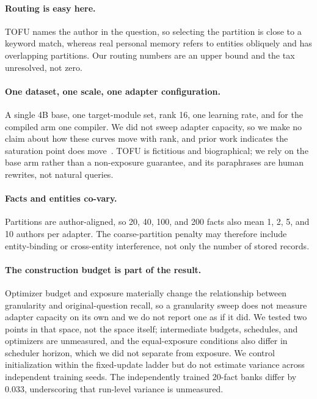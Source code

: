\documentclass{article}
\begin{document}
\paragraph{Routing is easy here.} TOFU names the author in the question, so
selecting the partition is close to a keyword match, whereas real personal memory
refers to entities obliquely and has overlapping partitions. Our routing numbers
are an upper bound and the tax unresolved, not zero.

\paragraph{One dataset, one scale, one adapter configuration.} A single 4B base,
one target-module set, rank 16, one learning rate, and for the compiled arm one
compiler. We did not sweep adapter capacity, so we make no claim about how these
curves move with rank, and prior work indicates the saturation point does
move~\citep{loramem}. TOFU is fictitious and biographical; we rely on the base arm
rather than a non-exposure guarantee, and its paraphrases are human rewrites, not
natural queries.

\paragraph{Facts and entities co-vary.} Partitions are author-aligned, so 20,
40, 100, and 200 facts also mean 1, 2, 5, and 10 authors per adapter. The
coarse-partition penalty may therefore include entity-binding or cross-entity
interference, not only the number of stored records.

\paragraph{The construction budget is part of the result.} Optimizer budget and
exposure materially change the relationship between granularity and
original-question recall, so a granularity sweep does not measure adapter capacity
on its own and we do not report one as if it did. We tested two points in that
space, not the space itself; intermediate budgets, schedules, and optimizers are
unmeasured, and the equal-exposure conditions also differ in scheduler horizon,
which we did not separate from exposure. We control initialization within the
fixed-update ladder but do not estimate variance across independent training
seeds. The independently trained 20-fact banks differ by 0.033, underscoring that
run-level variance is unmeasured.
\end{document}
